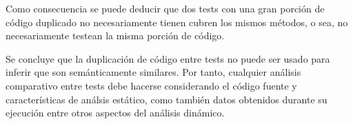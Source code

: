 \par Como consecuencia se puede deducir que dos tests con una gran porción de código duplicado no necesariamente tienen cubren los mismos métodos, o sea, no necesariamente testean la misma porción de código.

\par Se concluye que la duplicación de código entre tests no puede ser usado para inferir que son semánticamente similares. Por tanto, cualquier análisis comparativo entre tests debe hacerse considerando el código fuente y características de análsis estático, como también datos obtenidos durante su ejecución entre otros aspectos del análisis dinámico. 








